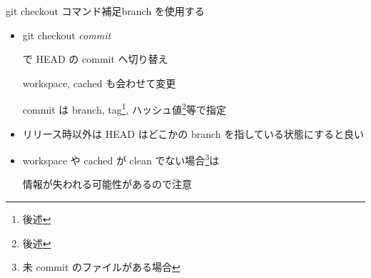 \begin{frame}[t]{git checkout コマンド補足}{branch を使用する}

  \begin{itemize}
  \item git checkout \textit{commit}

    で HEAD の commit へ切り替え

    workspace, cached も会わせて変更

    commit は branch, tag\footnote{後述}, ハッシュ値\footnote{後述}等で指定
    \vspace{2ex}

  \item リリース時以外は HEAD はどこかの branch を指している状態にすると良い
    \vspace{2ex}

  \item workspace や cached が clean でない場合\footnote{未 commit のファイルがある場合}は

    情報が失われる可能性があるので注意
  \end{itemize}

\end{frame}
